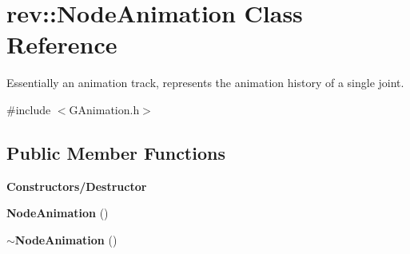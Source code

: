 \hypertarget{classrev_1_1_node_animation}{}\section{rev\+::Node\+Animation Class Reference}
\label{classrev_1_1_node_animation}


Essentially an animation track, represents the animation history of a single joint.  




{\ttfamily \#include $<$G\+Animation.\+h$>$}

\subsection*{Public Member Functions}
\begin{Indent}\textbf{ Constructors/\+Destructor}\par
\begin{DoxyCompactItemize}
\item 
\mbox{\label{classrev_1_1_node_animation_a1981693dafe835f9a485e697a4c7d961}} 
{\bfseries Node\+Animation} ()
\item 
\mbox{\label{classrev_1_1_node_animation_a576b2d69298c736ef65f9b6431fcd5e4}} 
{\bfseries $\sim$\+Node\+Animation} ()
\end{DoxyCompactItemize}
\end{Indent}
